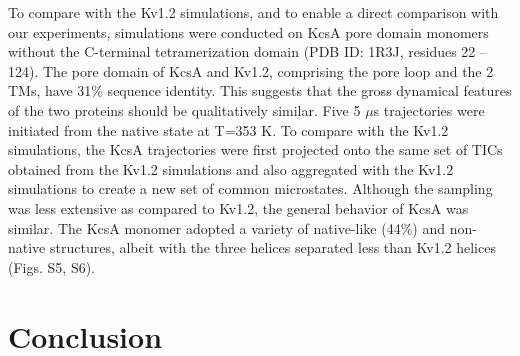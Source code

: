 To compare with the Kv1.2 simulations, and to enable a direct comparison with our experiments, simulations were conducted on KcsA pore domain monomers without the C-terminal tetramerization domain (PDB ID: 1R3J, residues 22 -- 124). The pore domain of KcsA and Kv1.2, comprising the pore loop and the 2 TMs, have 31\% sequence identity. This suggests that the gross dynamical features of the two proteins should be qualitatively similar. Five 5 $\mu$s trajectories were initiated from the native state at T=353 K. To compare with the Kv1.2 simulations, the KcsA trajectories were first projected onto the same set of TICs obtained from the Kv1.2 simulations and also aggregated with the Kv1.2 simulations to create a new set of common microstates. Although the sampling was less extensive as compared to Kv1.2, the general behavior of KcsA was similar. The KcsA monomer adopted a variety of native-like (44\%) and non-native structures, albeit with the three helices separated less than Kv1.2 helices (Figs. S5, S6). 

\section{Conclusion}

\renewcommand\thefigure{\thechapter.\arabic{figure}} 


